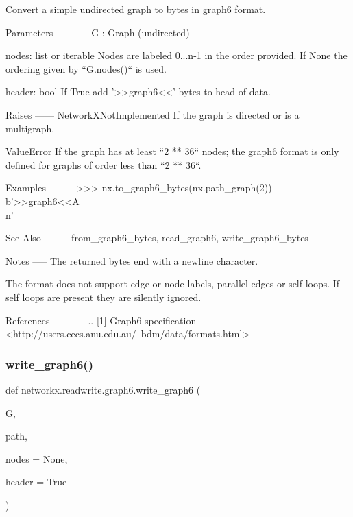 \begin{DoxyVerb}Convert a simple undirected graph to bytes in graph6 format.

Parameters
----------
G : Graph (undirected)

nodes: list or iterable
   Nodes are labeled 0...n-1 in the order provided.  If None the ordering
   given by ``G.nodes()`` is used.

header: bool
   If True add '>>graph6<<' bytes to head of data.

Raises
------
NetworkXNotImplemented
    If the graph is directed or is a multigraph.

ValueError
    If the graph has at least ``2 ** 36`` nodes; the graph6 format
    is only defined for graphs of order less than ``2 ** 36``.

Examples
--------
>>> nx.to_graph6_bytes(nx.path_graph(2))
b'>>graph6<<A_\\n'

See Also
--------
from_graph6_bytes, read_graph6, write_graph6_bytes

Notes
-----
The returned bytes end with a newline character.

The format does not support edge or node labels, parallel edges or
self loops. If self loops are present they are silently ignored.

References
----------
.. [1] Graph6 specification
       <http://users.cecs.anu.edu.au/~bdm/data/formats.html>\end{DoxyVerb}
 \mbox{\label{namespacenetworkx_1_1readwrite_1_1graph6_a75c8e32d09d505b1a5c5eb4b20bd967d}} 
\subsubsection{\texorpdfstring{write\+\_\+graph6()}{write\_graph6()}}
{\footnotesize\ttfamily def networkx.\+readwrite.\+graph6.\+write\+\_\+graph6 (\begin{DoxyParamCaption}\item[{}]{G,  }\item[{}]{path,  }\item[{}]{nodes = {\ttfamily None},  }\item[{}]{header = {\ttfamily True} }\end{DoxyParamCaption})}

